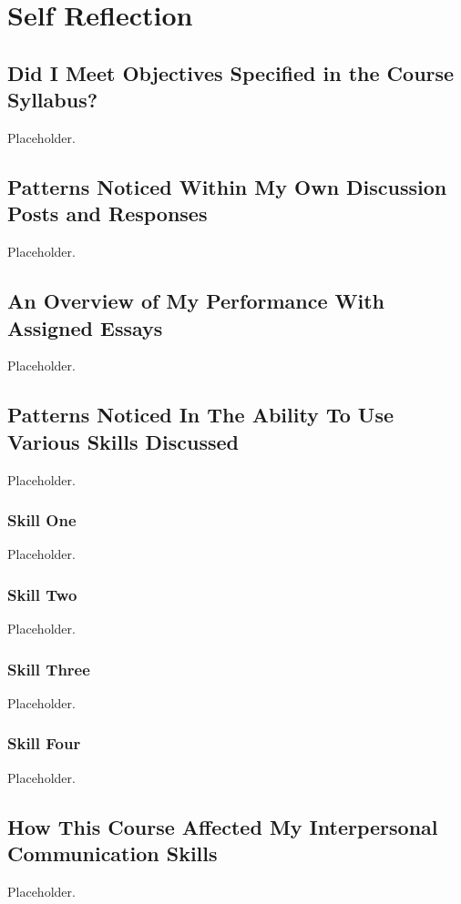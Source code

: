 
\section{Self Reflection}
\subsection{Did I Meet Objectives Specified in the Course Syllabus?}
  Placeholder.

\subsection{Patterns Noticed Within My Own Discussion Posts and Responses}
  Placeholder.

\subsection{An Overview of My Performance With Assigned Essays}
  Placeholder.

\subsection{Patterns Noticed In The Ability To Use Various Skills Discussed}
  Placeholder.
  \subsubsection{Skill One}
    Placeholder.
  \subsubsection{Skill Two}
    Placeholder.
  \subsubsection{Skill Three}
    Placeholder.
  \subsubsection{Skill Four}
    Placeholder.

\subsection{How This Course Affected My Interpersonal Communication Skills}
  Placeholder.

